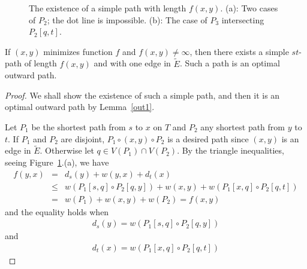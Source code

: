 \begin{figure}[t]
\begin{center}
\caption{The existence of a simple path with length $f(x,y)$. (a): Two cases of $P_2$; the dot line is impossible. (b): The case of $P_3$ intersecting $P_2[q,t]$.}
\label{outf}
\end{center}
\end{figure}

\begin{lemma}\label{outopt}
If $(x,y)$ minimizes function $f$ and $f(x,y)\neq \infty$, then there exists a simple $st$-path of length $f(x,y)$ and with one edge in $\widetilde{E}$. Such a path is an optimal outward path.  
\end{lemma}
\begin{proof}
We shall show the existence of such a simple path, and then it is an optimal outward path by Lemma~\ref{out1}.

Let $P_1$ be the shortest path from $s$ to $x$ on $T$ and $P_2$ any shortest path from $y$ to $t$. If $P_1$ and $P_2$ are disjoint, $P_1\circ (x,y)\circ P_2$ is a desired path since $(x,y)$ is an edge in $\widetilde{E}$.
Otherwise let $q\in V(P_1)\cap V(P_2)$.
By the triangle inequalities, seeing Figure~\ref{outf}.(a), we have 
\begin{eqnarray*}
f(y,x)&=&d_s(y)+w(y,x)+d_t(x)\\
&\leq&w(P_1[s,q]\circ P_2[q,y])+w(x,y)+w(P_1[x,q]\circ P_2[q,t])\\
&=&w(P_1)+w(x,y)+w(P_2)=f(x,y) 
\end{eqnarray*}
and the equality holds when 
\begin{eqnarray}
d_s(y)=w(P_1[s,q]\circ P_2[q,y])\label{outeq1}
\end{eqnarray}
and 
\begin{eqnarray}
d_t(x)=w(P_1[x,q]\circ P_2[q,t]) \label{outeq2}
\end{eqnarray}


\end{proof}
